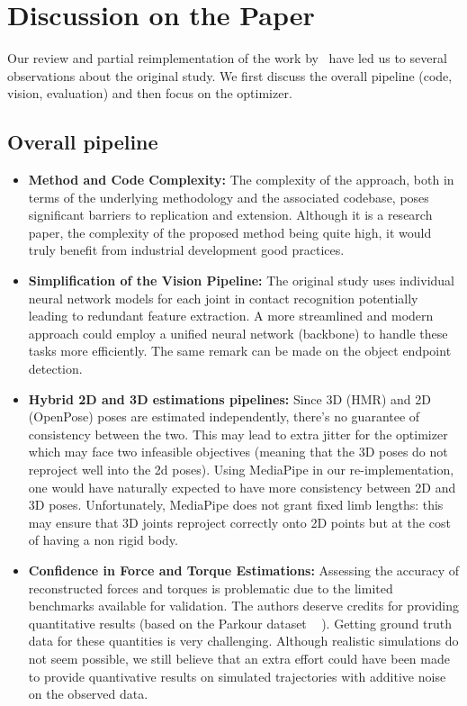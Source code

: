 \section{Discussion on the Paper}
\label{sec:discussion}

Our review and partial reimplementation of the work by~\citet{li2019estimating} have led us to several observations about 
the original study. We first discuss the overall pipeline (code, vision, evaluation) and then focus on the optimizer. 
\subsection{Overall pipeline}
\begin{itemize}
    \item \textbf{Method and Code Complexity:} The complexity of the approach, both in terms of the underlying methodology and the associated 
    codebase, poses significant barriers to replication and extension. Although it is a research paper, the complexity of the proposed method 
    being quite high, it would truly benefit from industrial development good practices.

    \item \textbf{Simplification of the Vision Pipeline:} The original study uses individual neural network models for each joint in contact recognition
    potentially leading to redundant feature extraction. A more streamlined and modern approach could employ a unified neural network (backbone) to handle 
    these tasks more efficiently. The same remark can be made on the object endpoint detection.

    \item \textbf{Hybrid 2D and 3D estimations pipelines:} Since 3D (HMR) and 2D (OpenPose) poses are estimated independently, there's no
    guarantee of consistency between the two. This may lead to extra jitter for the optimizer which may face two infeasible objectives 
    (meaning that the 3D poses do not reproject well into the 2d poses).
    Using MediaPipe in our re-implementation, one would have naturally expected to have more consistency between 2D and 3D poses. Unfortunately, MediaPipe
    does not grant fixed limb lengths: this may ensure that 3D joints reproject correctly onto 2D points
    but at the cost of having a non rigid body.
    
    \item \textbf{Confidence in Force and Torque Estimations:} Assessing the accuracy of reconstructed forces and torques is problematic due 
    to the limited benchmarks available for validation. The authors deserve credits for providing quantitative results (based on the Parkour dataset ~\cite{maldonado} ).
    Getting ground truth data for these quantities is very challenging. Although realistic simulations do not seem possible, we still believe that an extra
    effort could have been made to provide quantivative results on simulated trajectories with additive noise on the observed data.

\end{itemize}

